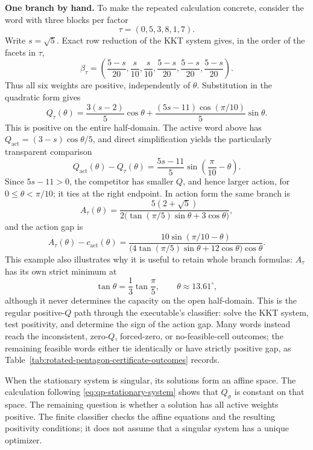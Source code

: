 \par\medskip\noindent\textbf{One branch by hand.}
To make the repeated calculation concrete, consider the word with three
blocks per factor
\[
  \tau=(0,5,3,8,1,7).
\]
Write \(s=\sqrt5\).  Exact row reduction of the KKT system gives, in the order
of the facets in \(\tau\),
\[
  \beta_\tau=
  \left(
    \frac{5-s}{20},\frac{s}{10},\frac{s}{10},
    \frac{5-s}{20},\frac{5-s}{20},\frac{5-s}{20}
  \right).
\]
Thus all six weights are positive, independently of \(\theta\).  Substitution
in the quadratic form gives
\[
  Q_\tau(\theta)
  =\frac{3(s-2)}5\cos\theta
   +\frac{(5s-11)\cos(\pi/10)}5\sin\theta.
\]
This is positive on the entire half-domain.  The active word above has
\(Q_{\mathrm{act}}=(3-s)\cos\theta/5\), and direct simplification yields the
particularly transparent comparison
\begin{equation}
\label{eq:rotated-pentagon-worked-q-gap}
  Q_{\mathrm{act}}(\theta)-Q_\tau(\theta)
  =\frac{5s-11}{5}\sin\!\left(\frac{\pi}{10}-\theta\right).
\end{equation}
Since \(5s-11>0\), the competitor has smaller \(Q\), and hence larger action,
for \(0\le\theta<\pi/10\); it ties at the right endpoint.  In action form the
same branch is
\begin{equation}
\label{eq:rotated-pentagon-worked-action}
  A_\tau(\theta)
  =\frac{5(2+\sqrt5)}
  {2\bigl(\tan(\pi/5)\sin\theta+3\cos\theta\bigr)},
\end{equation}
and the action gap is
\[
  A_\tau(\theta)-c_{\mathrm{act}}(\theta)
  =\frac{10\sin(\pi/10-\theta)}
  {\bigl(4\tan(\pi/5)\sin\theta+12\cos\theta\bigr)\cos\theta}.
\]
This example also illustrates why it is useful to retain whole branch
formulas: \(A_\tau\) has its own strict minimum at
\[
  \tan\theta=\frac13\tan\frac\pi5,
  \qquad \theta\approx13.61^\circ,
\]
although it never determines the capacity on the open half-domain.  This is the
regular positive-\(Q\) path through the executable's classifier: solve the KKT
system, test positivity, and determine the sign of the action gap.  Many words
instead reach the inconsistent, zero-\(Q\), forced-zero, or no-feasible-cell
outcomes; the remaining feasible words either tie identically or have strictly
positive gap, as Table~\ref{tab:rotated-pentagon-certificate-outcomes} records.

When the stationary system is singular, its solutions form an affine
space. The calculation following \eqref{eq:qp-stationary-system} shows
that $Q_\sigma$ is constant on that space. The remaining question is
whether a solution has all active weights positive. The finite classifier
checks the affine equations and the resulting positivity conditions;
it does not assume that a singular system has a unique optimizer.

